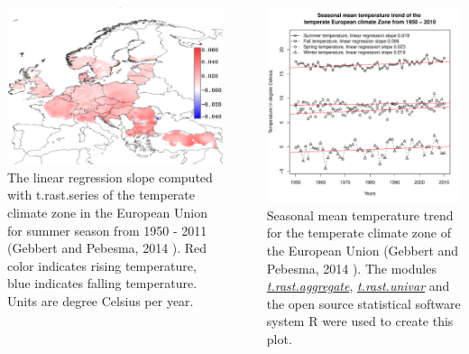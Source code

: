 \documentclass[25pt, margin=0mm, innermargin=15mm, blockverticalspace=15mm, colspace=15mm, subcolspace=8mm]{tikzposter}
\newcommand{\gmodule}[1]{\href{http://grass.osgeo.org/grass70/manuals/#1.html}{\emph{#1}}}
\begin{document}
\begin{columns}
{\begin{minipage}{0.5\linewidth}
\includegraphics[scale=0.5]{images/summer_mean_temp_slope.pdf}
The linear regression slope computed with t.rast.series of the temperate climate zone in the European Union
for summer season from 1950 - 2011 (Gebbert and Pebesma, 2014 \cite{Gebbert20141}). Red color
indicates rising temperature, blue indicates falling temperature. Units are degree Celsius per year.
\end{minipage}
~
\begin{minipage}{0.5\linewidth}
\includegraphics[scale=1.25]{images/Seasonal_temperature_trend_Europe_1950_2010.pdf}
Seasonal mean temperature trend for the temperate climate zone of the European Union
(Gebbert and Pebesma, 2014 \cite{Gebbert20141}). The modules \gmodule{t.rast.aggregate},
\gmodule{t.rast.univar} and the open source statistical software system R
were used to create this plot.
\end{minipage}
}



\end{columns}
\end{document}
